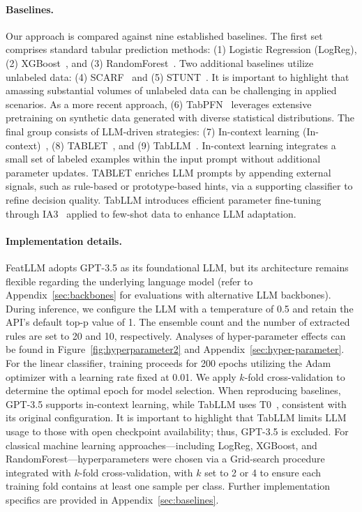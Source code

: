 \vspace*{-0.12in}
\paragraph{Baselines.}
Our approach is compared against nine established baselines. The first set comprises standard tabular prediction methods: (1) Logistic Regression (LogReg), (2) XGBoost~\cite{chen2016xgboost}, and (3) RandomForest~\cite{ho1995random}. Two additional baselines utilize unlabeled data: (4) SCARF~\cite{bahri2022scarf} and (5) STUNT~\cite{nam2023stunt}. It is important to highlight that amassing substantial volumes of unlabeled data can be challenging in applied scenarios. As a more recent approach, (6) TabPFN~\cite{hollmann2022tabpfn} leverages extensive pretraining on synthetic data generated with diverse statistical distributions. The final group consists of LLM-driven strategies: (7) In-context learning (In-context)~\cite{wei2022emergent}, (8) TABLET~\cite{slack2023tablet}, and (9) TabLLM~\cite{hegselmann2023tabllm}. In-context learning integrates a small set of labeled examples within the input prompt without additional parameter updates. TABLET enriches LLM prompts by appending external signals, such as rule-based or prototype-based hints, via a supporting classifier to refine decision quality. TabLLM introduces efficient parameter fine-tuning through IA3~\cite{liu2022few} applied to few-shot data to enhance LLM adaptation.

\vspace*{-0.12in}
\paragraph{Implementation details.}
\textsf{FeatLLM} adopts GPT-3.5 as its foundational LLM, but its architecture remains flexible regarding the underlying language model (refer to Appendix~\ref{sec:backbones} for evaluations with alternative LLM backbones). During inference, we configure the LLM with a temperature of 0.5 and retain the API's default top-p value of 1. The ensemble count and the number of extracted rules are set to 20 and 10, respectively. Analyses of hyper-parameter effects can be found in Figure~\ref{fig:hyperparameter2} and Appendix~\ref{sec:hyper-parameter}. For the linear classifier, training proceeds for 200 epochs utilizing the Adam optimizer with a learning rate fixed at 0.01. We apply $k$-fold cross-validation to determine the optimal epoch for model selection. When reproducing baselines, GPT-3.5 supports in-context learning, while TabLLM uses T0~\cite{sanh2022multitask}, consistent with its original configuration. It is important to highlight that TabLLM limits LLM usage to those with open checkpoint availability; thus, GPT-3.5 is excluded. For classical machine learning approaches—including LogReg, XGBoost, and RandomForest—hyperparameters were chosen via a Grid-search procedure integrated with $k$-fold cross-validation, with $k$ set to 2 or 4 to ensure each training fold contains at least one sample per class. Further implementation specifics are provided in Appendix~\ref{sec:baselines}.

